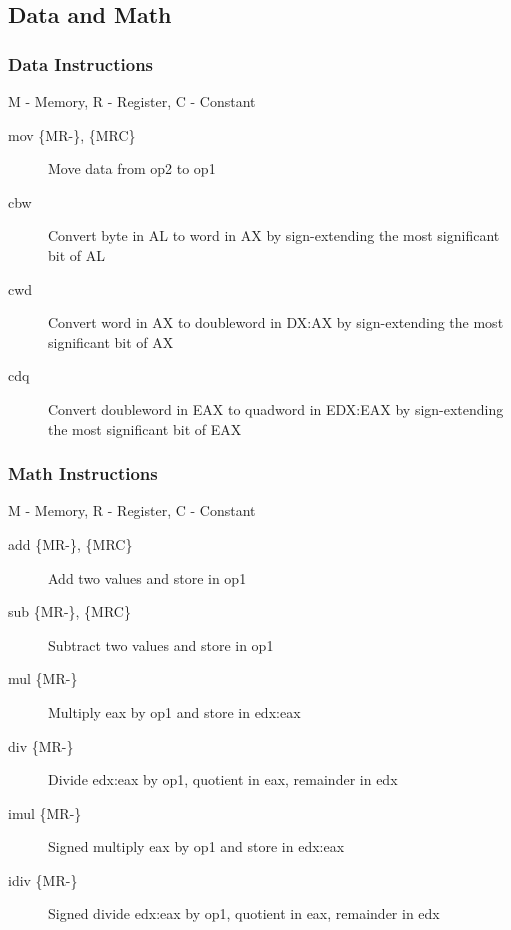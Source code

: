 \subsection{Data and Math}

\subsubsection*{Data Instructions}
M - Memory, R - Register, C - Constant
\begin{description}
    \item[mov \{MR-\}, \{MRC\}] Move data from op2 to op1 
    \item[cbw] Convert byte in AL to word in AX by sign-extending the most significant bit of AL
    \item[cwd] Convert word in AX to doubleword in DX:AX by sign-extending the most significant bit of AX
    \item[cdq] Convert doubleword in EAX to quadword in EDX:EAX by sign-extending the most significant bit of EAX
\end{description}

\subsubsection*{Math Instructions}
M - Memory, R - Register, C - Constant
\begin{description}
    \item[add \{MR-\}, \{MRC\}] Add two values and store in op1
    \item[sub \{MR-\}, \{MRC\}] Subtract two values and store in op1
    \item[mul \{MR-\}] Multiply eax by op1 and store in edx:eax
    \item[div \{MR-\}] Divide edx:eax by op1, quotient in eax, remainder in edx
    \item[imul \{MR-\}] Signed multiply eax by op1 and store in edx:eax
    \item[idiv \{MR-\}] Signed divide edx:eax by op1, quotient in eax, remainder in edx
\end{description}

